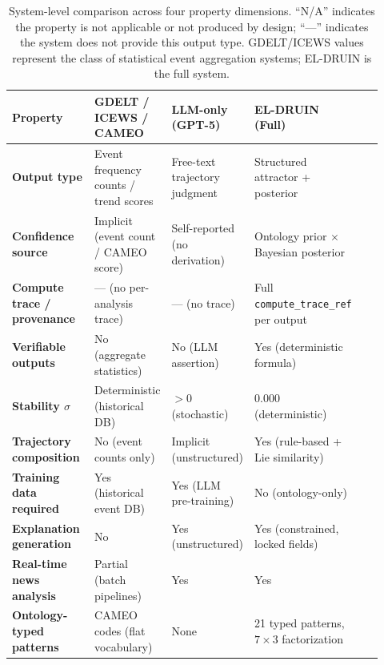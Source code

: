 \documentclass{llncs}
\begin{document}
\begin{table}[h]
\centering
\caption{System-level comparison across four property dimensions. ``N/A'' indicates
the property is not applicable or not produced by design; ``---'' indicates the system
does not provide this output type. GDELT/ICEWS values represent the class of
statistical event aggregation systems; EL-DRUIN is the full system.}
\label{tab:system-comparison}
\small
\begin{tabular}{@{}p{0.26\linewidth}p{0.17\linewidth}p{0.17\linewidth}p{0.17\linewidth}p{0.15\linewidth}@{}}
\toprule
Property & GDELT / ICEWS / CAMEO & LLM-only (GPT-5) & EL-DRUIN (Full) \\
\midrule
\textbf{Output type}
  & Event frequency counts / trend scores
  & Free-text trajectory judgment
  & Structured attractor + posterior \\
\textbf{Confidence source}
  & Implicit (event count / CAMEO score)
  & Self-reported (no derivation)
  & Ontology prior $\times$ Bayesian posterior \\
\textbf{Compute trace / provenance}
  & --- (no per-analysis trace)
  & --- (no trace)
  & Full \texttt{compute\_trace\_ref} per output \\
\textbf{Verifiable outputs}
  & No (aggregate statistics)
  & No (LLM assertion)
  & Yes (deterministic formula) \\
\textbf{Stability $\sigma$}
  & Deterministic (historical DB)
  & $> 0$ (stochastic)
  & 0.000 (deterministic) \\
\textbf{Trajectory composition}
  & No (event counts only)
  & Implicit (unstructured)
  & Yes (rule-based + Lie similarity) \\
\textbf{Training data required}
  & Yes (historical event DB)
  & Yes (LLM pre-training)
  & No (ontology-only) \\
\textbf{Explanation generation}
  & No
  & Yes (unstructured)
  & Yes (constrained, locked fields) \\
\textbf{Real-time news analysis}
  & Partial (batch pipelines)
  & Yes
  & Yes \\
\textbf{Ontology-typed patterns}
  & CAMEO codes (flat vocabulary)
  & None
  & 21 typed patterns, $7 \times 3$ factorization \\
\bottomrule
\end{tabular}
\end{table}
\end{document}
